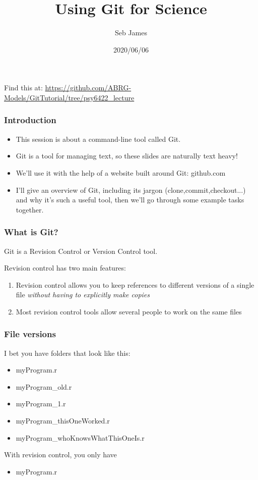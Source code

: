 \documentclass{beamer}
\title{Using Git for Science}
\author{Seb James}
\institute{psy6422}
\date{2020/06/06}
\begin{document}
\begin{frame}
  \titlepage %
  Find this at: \url{https://github.com/ABRG-Models/GitTutorial/tree/psy6422_lecture}
\end{frame}

\begin{frame}
  \frametitle{Introduction}
  \begin{itemize}
    \item This session is about a command-line tool called Git.

    \item Git is a tool for managing text, so these slides are naturally text
      heavy!

    \item We'll use it with the help of a website built around Git: github.com

    \item I'll give an overview of Git, including its jargon
      (\alert{clone},\alert{commit},\alert{checkout}...) and why it's
      such a useful tool, then we'll go through some example tasks together.
  \end{itemize}
\end{frame}

\begin{frame}
  \frametitle{What is Git?}
  Git is a \alert{Revision Control} or \alert{Version Control} tool.

  Revision control has two main features:

  \begin{enumerate}
    \pause \item Revision control allows you to keep references to different versions of a
      single file \emph{without having to explicitly make copies}
      \pause \item Most revision control tools allow several people to work
      on the same files %
  \end{enumerate}
\end{frame}

\begin{frame}
  \frametitle{File versions}
  I bet you have folders that look like this:
  \pause \begin{itemize}
      \item myProgram.r
      \pause \item myProgram\_old.r
      \item myProgram\_1.r
      \item myProgram\_thisOneWorked.r
      \item myProgram\_whoKnowsWhatThisOneIs.r
  \end{itemize}
  \pause With revision control, you only have
  \begin{itemize}
  \item myProgram.r
  \end{itemize}
\end{frame}
\end{document}
